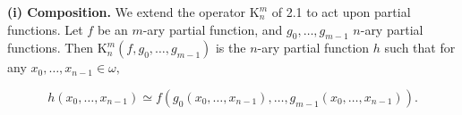 \textbf{(i) Composition.} We extend the operator $\text{K}_n^m$ of 2.1 to act upon partial functions. Let $f$ be an $m$-ary partial function, and $g_0, \ldots, g_{m-1}$ $n$-ary partial functions. Then $\text{K}_n^m(f, g_0, \ldots, g_{m-1})$ is the $n$-ary partial function $h$ such that for any $x_0, \ldots, x_{n-1} \in \omega,$

$$h(x_0, \ldots, x_{n-1}) \simeq f(g_0(x_0, \ldots, x_{n-1}), \ldots, g_{m-1}(x_0, \ldots, x_{n-1})).$$
